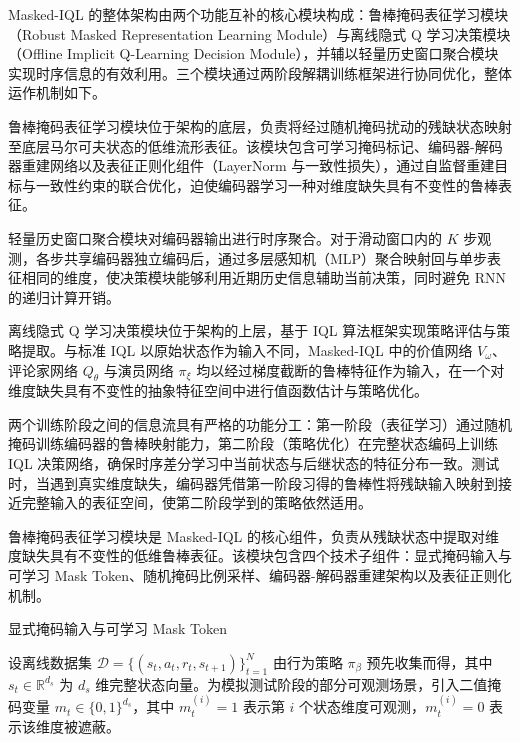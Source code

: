 

Masked-IQL 的整体架构由两个功能互补的核心模块构成：鲁棒掩码表征学习模块（Robust Masked Representation Learning Module）与离线隐式 Q 学习决策模块（Offline Implicit Q-Learning Decision Module），并辅以轻量历史窗口聚合模块实现时序信息的有效利用。三个模块通过两阶段解耦训练框架进行协同优化，整体运作机制如下。

鲁棒掩码表征学习模块位于架构的底层，负责将经过随机掩码扰动的残缺状态映射至底层马尔可夫状态的低维流形表征。该模块包含可学习掩码标记、编码器-解码器重建网络以及表征正则化组件（LayerNorm 与一致性损失），通过自监督重建目标与一致性约束的联合优化，迫使编码器学习一种对维度缺失具有不变性的鲁棒表征。

轻量历史窗口聚合模块对编码器输出进行时序聚合。对于滑动窗口内的 $K$ 步观测，各步共享编码器独立编码后，通过多层感知机（MLP）聚合映射回与单步表征相同的维度，使决策模块能够利用近期历史信息辅助当前决策，同时避免 RNN 的递归计算开销。

离线隐式 Q 学习决策模块位于架构的上层，基于 IQL 算法框架实现策略评估与策略提取。与标准 IQL 以原始状态作为输入不同，Masked-IQL 中的价值网络 $V_\omega$、评论家网络 $Q_\theta$ 与演员网络 $\pi_\xi$ 均以经过梯度截断的鲁棒特征作为输入，在一个对维度缺失具有不变性的抽象特征空间中进行值函数估计与策略优化。


两个训练阶段之间的信息流具有严格的功能分工：第一阶段（表征学习）通过随机掩码训练编码器的鲁棒映射能力，第二阶段（策略优化）在完整状态编码上训练 IQL 决策网络，确保时序差分学习中当前状态与后继状态的特征分布一致。测试时，当遇到真实维度缺失，编码器凭借第一阶段习得的鲁棒性将残缺输入映射到接近完整输入的表征空间，使第二阶段学到的策略依然适用。


鲁棒掩码表征学习模块是 Masked-IQL 的核心组件，负责从残缺状态中提取对维度缺失具有不变性的低维鲁棒表征。该模块包含四个技术子组件：显式掩码输入与可学习 Mask Token、随机掩码比例采样、编码器-解码器重建架构以及表征正则化机制。

显式掩码输入与可学习 Mask Token

设离线数据集 $\mathcal{D} = \{(s_t, a_t, r_t, s_{t+1})\}_{t=1}^{N}$ 由行为策略 $\pi_\beta$ 预先收集而得，其中 $s_t \in \mathbb{R}^{d_s}$ 为 $d_s$ 维完整状态向量。为模拟测试阶段的部分可观测场景，引入二值掩码变量 $m_t \in \{0, 1\}^{d_s}$，其中 $m_t^{(i)} = 1$ 表示第 $i$ 个状态维度可观测，$m_t^{(i)} = 0$ 表示该维度被遮蔽。

